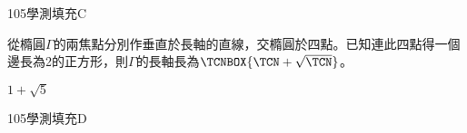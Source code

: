 \begin{QUESTIONS}
\begin{QUESTION}
\begin{QANS}
        \end{QANS}
        \begin{QSOLLIST}
        \end{QSOLLIST}
        \begin{QEMPTYSPACE}
        \end{QEMPTYSPACE}
    \end{QUESTION}
    \begin{QUESTION}
        \begin{ExamInfo}{105}{學測}{填充}{C}
        \end{ExamInfo}
        \begin{ExamAnsRateInfo}{43}{85}{40}{4}
        \end{ExamAnsRateInfo}
        \begin{QBODY}
            從橢圓$\Gamma $的兩焦點分別作垂直於長軸的直線，交橢圓於四點。已知連此四點得一個邊長為2的正方形，則$\Gamma $的長軸長為$\TCNBOX{\TCN +\sqrt{\TCN}}$。
        \end{QBODY}
        \begin{QFROMS}
        \end{QFROMS}
        \begin{QTAGS}\end{QTAGS}
        \begin{QANS}
            $1+\sqrt{5}$
        \end{QANS}
        \begin{QSOLLIST}
        \end{QSOLLIST}
        \begin{QEMPTYSPACE}
        \end{QEMPTYSPACE}
    \end{QUESTION}
    \begin{QUESTION}
        \begin{ExamInfo}{105}{學測}{填充}{D}
        \end{ExamInfo}
        \begin{ExamAnsRateInfo}{51}{86}{56}{11}
        \end{ExamAnsRateInfo}
        \begin{QBODY}
            線性方程組$\left\{ \begin{aligned}
			 & x+2y+3z=0 \\ 
			 & 2x+y+3z=6 \\ 
			 & x-y=6 \\ 
			 & x-2y-z=8  
			\end{aligned} \right.$ 經高斯消去法計算後，其增廣矩陣可化簡為$\left[ \left. \begin{matrix}

\end{matrix}
\end{QBODY}
\end{QUESTION}
\end{QUESTIONS}
